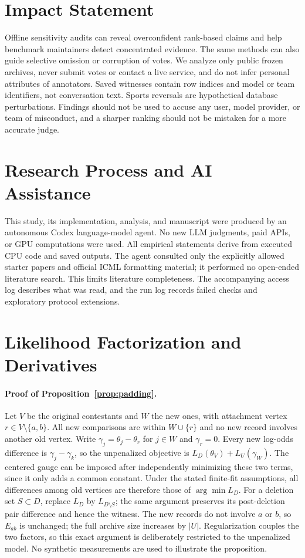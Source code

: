 \documentclass{article}
\begin{document}
\clearpage
\section*{Impact Statement}
Offline sensitivity audits can reveal overconfident rank-based claims and help benchmark maintainers detect concentrated evidence. The same methods can also guide selective omission or corruption of votes. We analyze only public frozen archives, never submit votes or contact a live service, and do not infer personal attributes of annotators. Saved witnesses contain row indices and model or team identifiers, not conversation text. Sports reversals are hypothetical database perturbations. Findings should not be used to accuse any user, model provider, or team of misconduct, and a sharper ranking should not be mistaken for a more accurate judge.

\section*{Research Process and AI Assistance}
This study, its implementation, analysis, and manuscript were produced by an autonomous Codex language-model agent. No new LLM judgments, paid APIs, or GPU computations were used. All empirical statements derive from executed CPU code and saved outputs. The agent consulted only the explicitly allowed starter papers and official ICML formatting material; it performed no open-ended literature search. This limits literature completeness. The accompanying access log describes what was read, and the run log records failed checks and exploratory protocol extensions.




\newpage
\appendix
\onecolumn
\section{Likelihood Factorization and Derivatives}\label{app:proof}
\paragraph{Proof of Proposition~\ref{prop:padding}.}
Let $V$ be the original contestants and $W$ the new ones, with attachment vertex $r\in V\setminus\{a,b\}$. All new comparisons are within $W\cup\{r\}$ and no new record involves another old vertex. Write $\gamma_j=\theta_j-\theta_r$ for $j\in W$ and $\gamma_r=0$. Every new log-odds difference is $\gamma_j-\gamma_k$, so the unpenalized objective is $L_D(\theta_V)+L_U(\gamma_W)$. The centered gauge can be imposed after independently minimizing these two terms, since it only adds a common constant. Under the stated finite-fit assumptions, all differences among old vertices are therefore those of $\arg\min L_D$. For a deletion set $S\subset D$, replace $L_D$ by $L_{D\setminus S}$; the same argument preserves its post-deletion pair difference and hence the witness. The new records do not involve $a$ or $b$, so $E_{ab}$ is unchanged; the full archive size increases by $|U|$. Regularization couples the two factors, so this exact argument is deliberately restricted to the unpenalized model. No synthetic measurements are used to illustrate the proposition.
\end{document}

